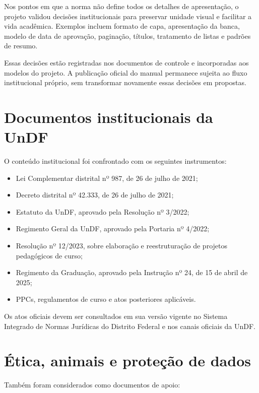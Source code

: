Nos pontos em que a norma não define todos os detalhes de apresentação, o projeto validou decisões institucionais para preservar unidade visual e facilitar a vida acadêmica. Exemplos incluem formato de capa, apresentação da banca, modelo de data de aprovação, paginação, títulos, tratamento de listas e padrões de resumo.

Essas decisões estão registradas nos documentos de controle e incorporadas aos modelos do projeto. A publicação oficial do manual permanece sujeita ao fluxo institucional próprio, sem transformar novamente essas decisões em propostas.

\section{Documentos institucionais da UnDF}

O conteúdo institucional foi confrontado com os seguintes instrumentos:

\begin{itemize}
  \item Lei Complementar distrital nº 987, de 26 de julho de 2021;
  \item Decreto distrital nº 42.333, de 26 de julho de 2021;
  \item Estatuto da UnDF, aprovado pela Resolução nº 3/2022;
  \item Regimento Geral da UnDF, aprovado pela Portaria nº 4/2022;
  \item Resolução nº 12/2023, sobre elaboração e reestruturação de projetos pedagógicos de curso;
  \item Regimento da Graduação, aprovado pela Instrução nº 24, de 15 de abril de 2025;
  \item PPCs, regulamentos de curso e atos posteriores aplicáveis.
\end{itemize}

Os atos oficiais devem ser consultados em sua versão vigente no Sistema Integrado de Normas Jurídicas do Distrito Federal e nos canais oficiais da UnDF.

\section{Ética, animais e proteção de dados}

Também foram considerados como documentos de apoio:

